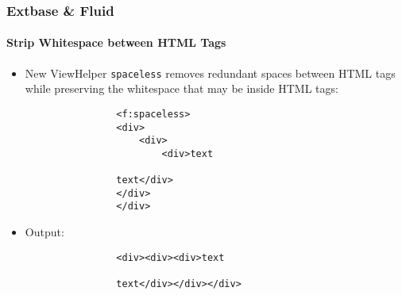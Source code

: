 \begin{frame}[fragile]
	\frametitle{Extbase \& Fluid}
	\framesubtitle{Strip Whitespace between HTML Tags}

	\begin{itemize}

		\item New ViewHelper \texttt{spaceless} removes redundant spaces between HTML tags
			while preserving the whitespace that may be inside HTML tags:

			\begin{lstlisting}
				<f:spaceless>
				<div>
				    <div>
				        <div>text

				text</div>
				</div>
				</div>
			\end{lstlisting}

		\item Output:

			\begin{lstlisting}
				<div><div><div>text

				text</div></div></div>
			\end{lstlisting}

	\end{itemize}

\end{frame}


